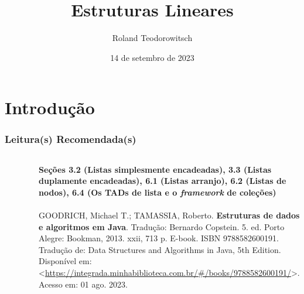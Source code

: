 \documentclass[aspectratio=169]{beamer}
\title[\sc{Estruturas Lineares}]{Estruturas Lineares}
\author[Roland Teodorowitsch]{Roland Teodorowitsch}
\institute[ALEST I - EP - PUCRS]{Algoritmos e Estruturas de Dados I - Escola Politécnica - PUCRS}
\date{14 de setembro de 2023}
\begin{document}
\justifying

\begin{frame}
	\titlepage
\end{frame}

\section{Introdução}

\begin{frame}\frametitle{Leitura(s) Recomendada(s)}

\begin{columns}[T]
\begin{column}{0.15\linewidth}
\vspace{-3mm}
\begin{figure}[h]
	\centering
	\includegraphics[height=0.3\paperheight]{imagens/livro_goodrich.jpg}
\end{figure}
\end{column}
\begin{column}{0.85\linewidth}
\tiny{\textbf{Seções 3.2 (Listas simplesmente encadeadas), 3.3 (Listas duplamente encadeadas), 6.1 (Listas arranjo), 6.2 (Listas de nodos), 6.4 (Os TADs de lista e o \emph{framework} de coleções)}\\
~}\\
\scriptsize{GOODRICH, Michael T.; TAMASSIA, Roberto. \textbf{Estruturas de dados e algoritmos em Java}. Tradução: Bernardo Copstein. 5. ed. Porto Alegre: Bookman, 2013. xxii, 713 p. E-book. ISBN 9788582600191. Tradução de: Data Structures and Algorithms in Java, 5th Edition. Disponível em: \textless{}\url{https://integrada.minhabiblioteca.com.br/\#/books/9788582600191/}\textgreater{}. Acesso em: 01 ago. 2023.}
\end{column}
\end{columns}

\end{frame}
\end{document}
